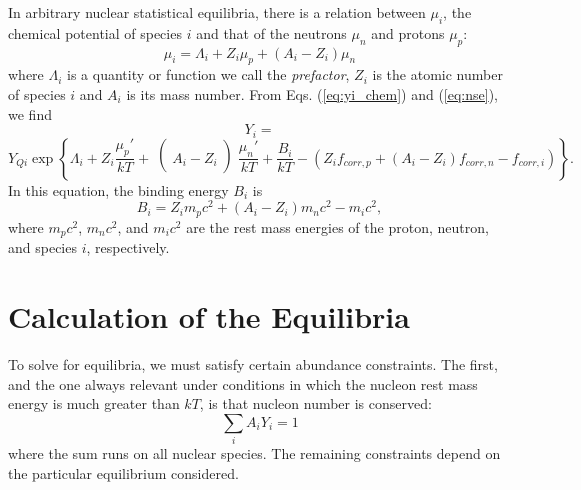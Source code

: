 \documentclass{article}    %
\begin{document}
In arbitrary nuclear statistical equilibria, there is a relation between
$\mu_i$, the chemical potential of species
$i$ and that of the neutrons $\mu_n$ and protons $\mu_p$:
\begin{equation}
\mu_i = \Lambda_i + Z_i \mu_p + \left( A_i - Z_i \right )\mu_n
\label{eq:nse}
\end{equation}
where $\Lambda_i$ is a quantity or function we call the {\em prefactor},
$Z_i$ is the atomic number of species $i$ and $A_i$ is its mass
number.  From Eqs. (\ref{eq:yi_chem}) and (\ref{eq:nse}), we find
\[
Y_i =
\]
\begin{equation}
 Y_{Qi} \exp\left\{\Lambda_i + Z_i \frac{\mu_p'}{kT} + \right(A_i - Z_i\left)
\frac{\mu_n'}{kT}
+ \frac{B_i}{kT} - \left( Z_i f_{corr,p} + \left( A_i - Z_i \right) f_{corr,n} -
f_{corr,i} \right)\right\}.
\label{eq:yi_final}
\end{equation}
In this equation, the binding energy $B_i$ is
\begin{equation}
B_i = Z_i m_pc^2 + \left( A_i - Z_i \right) m_nc^2 - m_ic^2,
\label{eq:binding}
\end{equation}
where $m_pc^2$, $m_nc^2$, and $m_ic^2$ are the rest mass energies of the
proton, neutron, and species $i$, respectively.

\section{Calculation of the Equilibria}

To solve for equilibria, we must satisfy certain abundance constraints.
The first, and the one always relevant under conditions in which
the nucleon rest mass energy is much greater than $kT$, is that nucleon
number is conserved:
\begin{equation}
\sum_i A_i Y_i = 1
\label{eq:a_i_y_i}
\end{equation}
where the sum runs on all nuclear species.  The remaining constraints
depend on the particular equilibrium considered.
\end{document}
